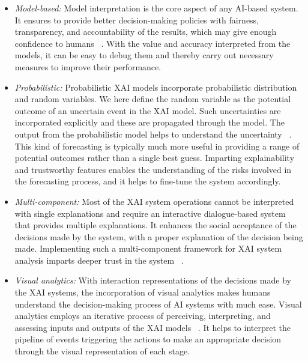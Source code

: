 \documentclass[journal]{IEEEtran}
\begin{document}
\begin{itemize}

    \item \textit{Model-based:} Model interpretation is the core aspect of any AI-based system. It ensures to provide better decision-making policies with fairness, transparency, and accountability of the results, which may give enough confidence to humans ~\cite{yang2022design}. With the value and accuracy interpreted from the models, it can be easy to debug them and thereby carry out necessary measures to improve their performance.

    \item \textit{Probabilistic:} Probabilistic XAI models incorporate probabilistic distribution and random variables. We here define the random variable as the potential outcome of an uncertain event in the XAI model. Such uncertainties are incorporated explicitly and these are propagated through the model. The output from the probabilistic model helps to understand the uncertainty ~\cite{konforti2022sign}. This kind of forecasting is typically much more useful in providing a range of potential outcomes rather than a single best guess. Imparting explainability and trustworthy features enables the understanding of the risks involved in the forecasting process, and it helps to fine-tune the system accordingly.  
    
    \item \textit{Multi-component:} Most of the XAI system operations cannot be interpreted with single explanations and require an interactive dialogue-based system that provides multiple explanations. It enhances the social acceptance of the decisions made by the system, with a proper explanation of the decision being made. Implementing such a multi-component framework for XAI system analysis imparts deeper trust in the system ~\cite{kim2021multi}.
    
    \item \textit{Visual analytics:} With interaction representations of the decisions made by the XAI systems, the incorporation of visual analytics makes humans understand the decision-making process of AI systems with much ease. Visual analytics employs an iterative process of perceiving, interpreting, and assessing inputs and outputs of the XAI models ~\cite{andrienko2022visual}. It helps to interpret the pipeline of events triggering the actions to make an appropriate decision through the visual representation of each stage. 
    

\end{itemize}
\end{document}
